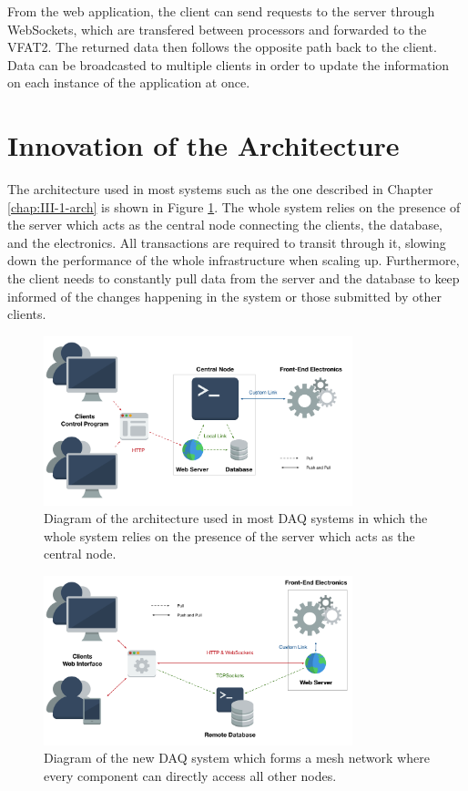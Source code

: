       From the web application, the client can send requests to the server through WebSockets, which are transfered between processors and forwarded to the VFAT2. The returned data then follows the opposite path back to the client. Data can be broadcasted to multiple clients in order to update the information on each instance of the application at once.

  \section{Innovation of the Architecture}

    The architecture used in most systems such as the one described in Chapter \ref{chap:III-1-arch} is shown in Figure \ref{fig:III-2-system-old}. The whole system relies on the presence of the server which acts as the central node connecting the clients, the database, and the electronics. All transactions are required to transit through it, slowing down the performance of the whole infrastructure when scaling up. Furthermore, the client needs to constantly pull data from the server and the database to keep informed of the changes happening in the system or those submitted by other clients. \\

    \begin{figure}[t!]
      \centering
      \includegraphics[width=0.8\textwidth]{img/III-2-web-daq/old-sys.png}
      \caption{Diagram of the architecture used in most DAQ systems in which the whole system relies on the presence of the server which acts as the central node.}
      \label{fig:III-2-system-old}
    \end{figure}

    \begin{figure}[b!]
      \centering
      \includegraphics[width=0.8\textwidth]{img/III-2-web-daq/new-sys.png}
      \caption{Diagram of the new DAQ system which forms a mesh network where every component can directly access all other nodes.}
      \label{fig:III-2-system-new}
    \end{figure}

